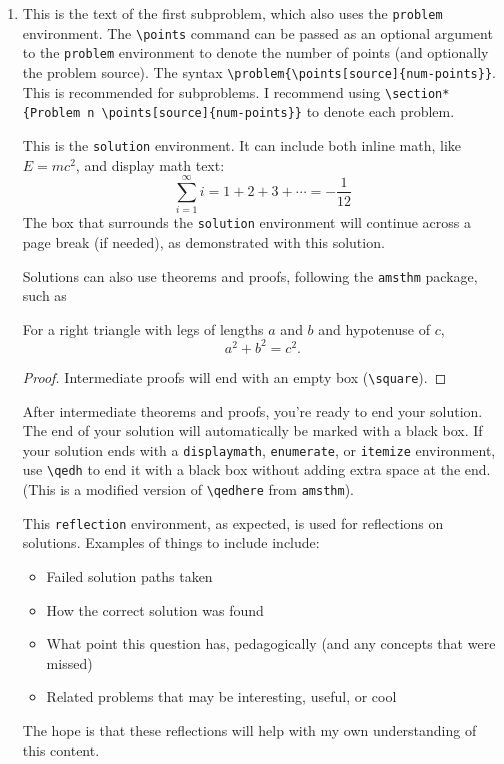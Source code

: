 \documentclass[11pt]{article}
\begin{document}
	\begin{enumerate}
		\item
		\begin{problem}{}
		This is the text of the first subproblem, which also uses the \texttt{problem} environment. The \texttt{\textbackslash points} command can be passed as an optional argument to the \texttt{problem} environment to denote the number of points (and optionally the problem source). The syntax \texttt{\textbackslash problem\{\textbackslash points[source]\{num-points\}\}}. This is recommended for subproblems. I recommend using \texttt{\textbackslash section*\{Problem n \textbackslash points[source]\{num-points\}\}} to denote each problem.
		\end{problem}
		\begin{solution}
		This is the \texttt{solution} environment. It can include both inline math, like \(E=mc^2\), and display math text:
		\[
		\sum_{i=1}^{\infty} i = 1 + 2 + 3 + \cdots = -\frac{1}{12}
		\]
		The box that surrounds the \texttt{solution} environment will continue across a page break (if needed), as demonstrated with this solution.
		
		Solutions can also use theorems and proofs, following the \texttt{amsthm} package, such as
		
		\begin{theorem}[Pythagoras]
			For a right triangle with legs of lengths $a$ and $b$ and hypotenuse of $c$, $$a^2 + b^2 = c^2.$$
		\end{theorem}

		\begin{proof}
		Intermediate proofs will end with an empty box (\texttt{\textbackslash square}).
		\end{proof}

		After intermediate theorems and proofs, you're ready to end your solution. The end of your solution will automatically be marked with a black box. If your solution ends with a \texttt{displaymath}, \texttt{enumerate}, or \texttt{itemize} environment, use \texttt{\textbackslash qedh} to end it with a black box without adding extra space at the end. (This is a modified version of \texttt{\textbackslash qedhere} from \texttt{amsthm}).
		\end{solution}
		\begin{reflection} This \texttt{reflection} environment, as expected, is used for reflections on solutions. Examples of things to include include:
		\begin{itemize}
			\item Failed solution paths taken
			\item How the correct solution was found
			\item What point this question has, pedagogically (and any concepts that were missed)
			\item Related problems that may be interesting, useful, or cool
		\end{itemize}
		The hope is that these reflections will help with my own understanding of this content.
		\end{reflection}
\end{enumerate}
\end{document}
